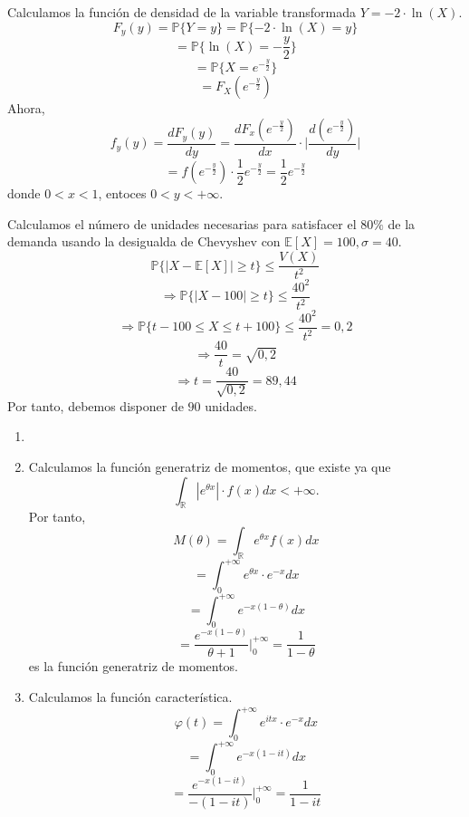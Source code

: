 \begin{ejr}
  Calculamos la función de densidad de la variable transformada $Y = -2 \cdot \ln(X)$.
  \[ 
    F_{y}(y) = \mathbb{P} \{ Y = y \} = \mathbb{P} \{ -2 \cdot \ln(X) = y \}
  \] 
  \[ 
    = \mathbb{P} \{ \ln(X) = - \frac{y}{2} \} 
  \] 
  \[ 
    = \mathbb{P} \{ X = e^{- \frac{y}{2}} \} 
  \] 
  \[ 
    = F_{X}(e^{-\frac{y}{2}}) 
  \] 
  Ahora,
  \[ 
    f_{y}(y) = \frac{d{F_{y}(y)}}{d{y}} = \frac{d{F_{x}(e^{-\frac{y}{2}})}}{d{x}}\cdot \Big | \frac{d{(e^{-\frac{y}{2}})}}{d{y}} \Big |
  \] 
  \[ 
    = f(e^{-\frac{y}{2}}) \cdot \frac{1}{2}e^{-\frac{y}{2}} = \frac{1}{2} e^{-\frac{y}{2}}
  \] 
  donde $0 < x < 1$, entoces $0 < y < +\infty$.
\end{ejr}

\begin{ejr}
  Calculamos el número de unidades necesarias para satisfacer el $80 \% $  de la demanda usando la desigualda de Chevyshev con $\mathbb{E} [ X ] = 100, \sigma = 40$.
  \[ 
    \mathbb{P} \{ | X - \mathbb{E} [ X ] | \geq t \} \leq \frac{V(X)}{t^{2}}
  \] 
  \[ 
    \Rightarrow \mathbb{P} \{ | X - 100 | \geq t \} \leq \frac{40^{2}}{t^{2}}
  \] 
  \[ 
    \Rightarrow \mathbb{P} \{ t - 100 \leq X \leq t + 100 \} \leq \frac{40^{2}}{t^{2}} = 0,2
  \] 
  \[ 
    \Rightarrow \frac{40}{t} = \sqrt{0,2}
  \] 
  \[ 
    \Rightarrow t = \frac{40}{\sqrt{0,2}} = 89,44
  \] 
  Por tanto, debemos disponer de $90$ unidades.
\end{ejr}

\begin{ejr}
  \begin{enumerate}[label=(\roman*)]
    \item []
    \item Calculamos la función generatriz de momentos, que existe ya que
      \[ 
        \int_{\mathbb{R}}^{}  |e^{\theta x}| \cdot f(x) dx < +\infty.
      \] 
      Por tanto,
      \[ 
        M(\theta) = \int_{\mathbb{R}}^{} e^{\theta x} f(x) dx 
      \] 
      \[ 
        = \int_{0}^{+ \infty} e^{\theta x} \cdot e^{-x} dx
      \] 
      \[ 
        = \int_{0}^{+ \infty} e^{-x(1 - \theta)} dx
      \] 
      \[  
        = \frac{e^{-x(1 - \theta)}}{\theta + 1} \Bigg |_{0}^{+\infty} = \frac{1}{1 - \theta}
      \]
      es la función generatriz de momentos.
    \item Calculamos la función característica.
      \[ 
        \varphi(t) = \int_{0}^{+ \infty} e^{itx} \cdot e^{-x} dx 
      \] 
      \[ 
        = \int_{0}^{+\infty} e^{-x(1 - it)} dx
      \] 
      \[ 
        = \frac{e^{-x(1 - it)}}{-(1 - it)} \Bigg |_{0}^{+\infty} = \frac{1}{1 - it}
      \] 
  \end{enumerate}
\end{ejr}
